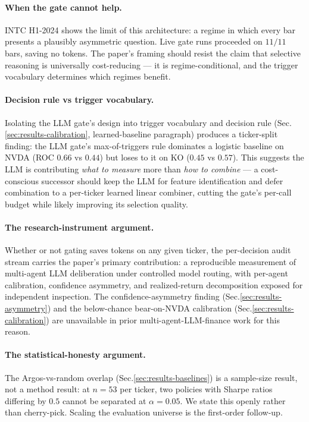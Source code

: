 \documentclass[11pt,a4paper]{article}
\begin{document}
\paragraph{When the gate cannot help.}
INTC H1-2024 shows the limit of this architecture: a regime in which
every bar presents a plausibly asymmetric question. Live gate runs
proceeded on $11/11$ bars, saving no tokens. The paper's framing
should resist the claim that selective reasoning is universally
cost-reducing --- it is regime-conditional, and the trigger vocabulary
determines which regimes benefit.

\paragraph{Decision rule vs trigger vocabulary.}
Isolating the LLM gate's design into trigger vocabulary and
decision rule (Sec.\ref{sec:results-calibration}, learned-baseline
paragraph) produces a ticker-split finding: the LLM gate's
max-of-triggers rule dominates a logistic baseline on NVDA (ROC
$0.66$ vs $0.44$) but loses to it on KO ($0.45$ vs $0.57$). This
suggests the LLM is contributing \emph{what to measure} more than
\emph{how to combine} --- a cost-conscious successor should keep the
LLM for feature identification and defer combination to a per-ticker
learned linear combiner, cutting the gate's per-call budget while
likely improving its selection quality.

\paragraph{The research-instrument argument.}
Whether or not gating saves tokens on any given ticker, the per-decision
audit stream carries the paper's primary contribution: a reproducible
measurement of multi-agent LLM deliberation under controlled model
routing, with per-agent calibration, confidence asymmetry, and
realized-return decomposition exposed for independent inspection.
The confidence-asymmetry finding
(Sec.\ref{sec:results-asymmetry}) and the below-chance bear-on-NVDA
calibration (Sec.\ref{sec:results-calibration}) are unavailable in
prior multi-agent-LLM-finance work for this reason.

\paragraph{The statistical-honesty argument.}
The Argos-vs-random overlap (Sec.\ref{sec:results-baselines}) is a
sample-size result, not a method result: at $n{=}53$ per ticker,
two policies with Sharpe ratios differing by $0.5$ cannot be
separated at $\alpha{=}0.05$. We state this openly rather than
cherry-pick. Scaling the evaluation universe is the first-order
follow-up.
\end{document}
